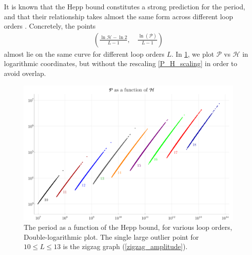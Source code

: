 \documentclass[11pt,a4paper]{article}
\newcommand{\period}{\mathcal P}
\renewcommand{\|}{\rule[-0.4ex]{0.2ex}{1.2em}}
\begin{document}
It is known that the Hepp bound constitutes a strong prediction for the period, and that their relationship takes almost the same form across different loop orders \cite{panzer_hepp_2022}. Concretely, the points
\begin{align}\label{P_H_scaling}
\left(  \frac{\ln \mathcal H - \ln 2}{L-1}, \quad \frac{\ln (\period)}{L-1} \right)  
\end{align}
almost lie on the same curve for different loop orders $L$.  
In \cref{P_H}, we plot $\period$ vs $\mathcal H$  in logarithmic coordinates, but without the rescaling \cref{P_H_scaling} in order to avoid overlap.


\begin{figure}[h]
	\centering
	\includegraphics[width=.85\linewidth]{P_H}
	\caption{The period as a function of the Hepp bound, for various loop orders, Double-logarithmic plot.   The single large  outlier point for $10 \leq L \leq 13$ is the zigzag graph  (\cref{zigzag_amplitude}). }
	\label{P_H}
\end{figure}
\end{document}
